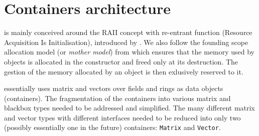\section{Containers architecture}\label{sec:container}
%
\linbox is mainly conceived around the RAII concept with re-entrant function
(Resource Acquisition Is Initialisation), introduced by
\cite{stroustrup1994design}. We also follow the {founding scope allocation}
model (or \emph{mother model}) from \cite{Dumas:2010:lbpar} which ensures that
the memory used by objects is allocated in the constructor and freed only at
its destruction. The gestion of the memory allocated by an object is then
exlusively reserved to it.
%
\par
%
\linbox essentially uses matrix and vectors over fields and rings as data objects
(containers).  The fragmentation of the containers into various matrix and
blackbox types needed to be addressed and simplified. The many different matrix and
vector types with different interfaces needed to be reduced into only two
(possibly essentially one in the future) containers: \texttt{Matrix} and
\texttt{Vector}.
%
